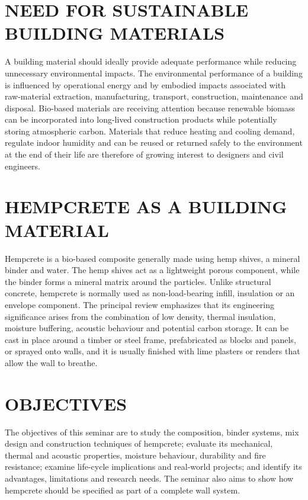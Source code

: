 \documentclass[12pt,a4paper,final]{report}
\begin{document}
\newpage
\section[Need for Sustainable Building Materials]{NEED FOR SUSTAINABLE BUILDING MATERIALS}
A building material should ideally provide adequate performance while reducing unnecessary
environmental impacts. The environmental performance of a building is influenced by
operational energy and by embodied impacts associated with raw-material extraction,
manufacturing, transport, construction, maintenance and disposal. Bio-based materials are
receiving attention because renewable biomass can be incorporated into long-lived
construction products while potentially storing atmospheric carbon. Materials that reduce
heating and cooling demand, regulate indoor humidity and can be reused or returned safely to
the environment at the end of their life are therefore of growing interest to designers and
civil engineers.

\vspace{5.5pt}
\section[Hempcrete as a Building Material]{HEMPCRETE AS A BUILDING MATERIAL}
Hempcrete is a bio-based composite generally made using hemp shives, a mineral binder and
water. The hemp shives act as a lightweight porous component, while the binder forms a
mineral matrix around the particles. Unlike structural concrete, hempcrete is normally used as
non-load-bearing infill, insulation or an envelope component. The principal review
emphasizes that its engineering significance arises from the combination of low density,
thermal insulation, moisture buffering, acoustic behaviour and potential carbon storage. It can be
cast in place around a timber or steel frame, prefabricated as blocks and panels, or sprayed onto
walls, and it is usually finished with lime plasters or renders that allow the wall to breathe.

\vspace{5.5pt}
\section[Objectives]{OBJECTIVES}
The objectives of this seminar are to study the composition, binder systems, mix design and
construction techniques of hempcrete; evaluate its mechanical, thermal and acoustic properties,
moisture behaviour, durability and fire resistance; examine life-cycle implications and
real-world projects; and identify its advantages, limitations and research needs. The seminar also
aims to show how hempcrete should be specified as part of a complete wall system.
\end{document}
